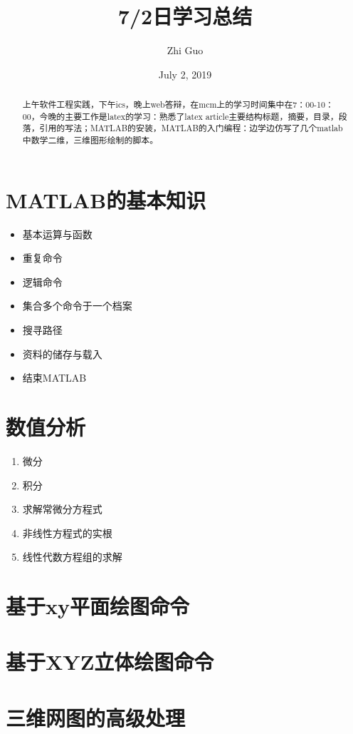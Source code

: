 \documentclass[UTF8]{ctexart}
\begin{document}
    \title{7/2日学习总结}
    \author{Zhi Guo}
    \date{July 2, 2019}
    \maketitle
    \begin{abstract}
        上午软件工程实践，下午ics，晚上web答辩，在mcm上的学习时间集中在7：00-10：00，今晚的主要工作是latex的学习：熟悉了latex article主要结构标题，摘要，目录，段落，引用的写法；MATLAB的安装，MATLAB的入门编程：边学边仿写了几个matlab中数学二维，三维图形绘制的脚本。
    \end{abstract}
    \section{MATLAB的基本知识}
        \begin{itemize}
          \item 基本运算与函数
          \item 重复命令
          \item 逻辑命令
          \item 集合多个命令于一个档案
          \item 搜寻路径
          \item 资料的储存与载入
          \item 结束MATLAB
        \end{itemize}
    \section{数值分析}
        \begin{enumerate}
          \item 微分
          \item 积分
          \item 求解常微分方程式
          \item 非线性方程式的实根
          \item 线性代数方程组的求解
        \end{enumerate}
    \section{基于xy平面绘图命令}
    \section{基于XYZ立体绘图命令}
    \section{三维网图的高级处理}
    
\end{document}
